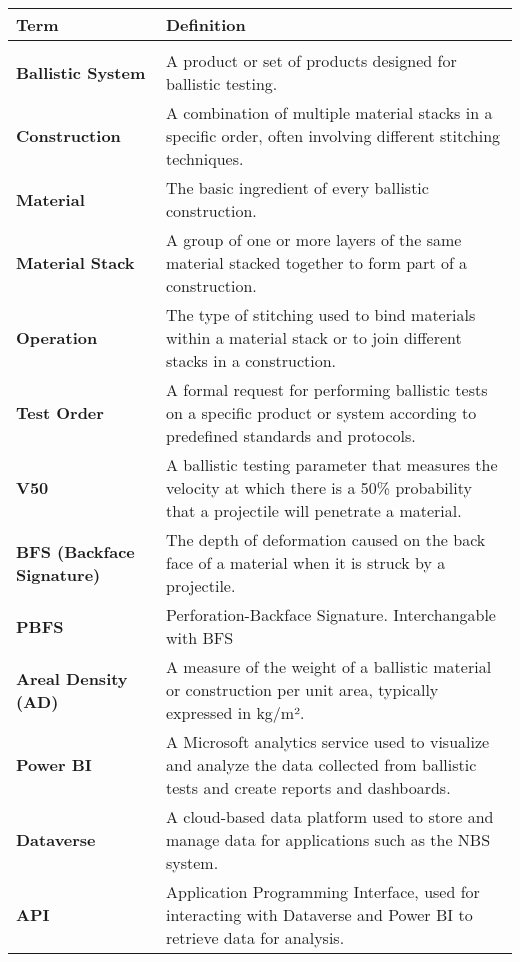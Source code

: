 \begin{small}
    \begin{longtable}{m{5cm} | m{9cm}}
        \textbf{Term} & \textbf{Definition} \\\hline\\
        \textbf{Ballistic System} & A product or set of products designed for ballistic testing. \\[2em]
        \textbf{Construction} & A combination of multiple material stacks in a specific order, often involving different stitching techniques. \\[2em]
        \textbf{Material} & The basic ingredient of every ballistic construction. \\[2em]
        \textbf{Material Stack} & A group of one or more layers of the same material stacked together to form part of a construction. \\[2em]
        \textbf{Operation} & The type of stitching used to bind materials within a material stack or to join different stacks in a construction. \\[2em]
        \textbf{Test Order} & A formal request for performing ballistic tests on a specific product or system according to predefined standards and protocols. \\[2em]
        \textbf{V50} & A ballistic testing parameter that measures the velocity at which there is a 50\% probability that a projectile will penetrate a material. \\[2em]
        \textbf{BFS (Backface Signature)} & The depth of deformation caused on the back face of a material when it is struck by a projectile. \\[2em]
        \textbf{PBFS} & Perforation-Backface Signature. Interchangable with BFS \\[2em]
        \textbf{Areal Density (AD)} & A measure of the weight of a ballistic material or construction per unit area, typically expressed in kg/m². \\[2em]
        \textbf{Power BI} & A Microsoft analytics service used to visualize and analyze the data collected from ballistic tests and create reports and dashboards. \\[2em]
        \textbf{Dataverse} & A cloud-based data platform used to store and manage data for applications such as the NBS system. \\[2em]
        \textbf{API} & Application Programming Interface, used for interacting with Dataverse and Power BI to retrieve data for analysis. \\[2em]

\end{longtable}
\end{small}
